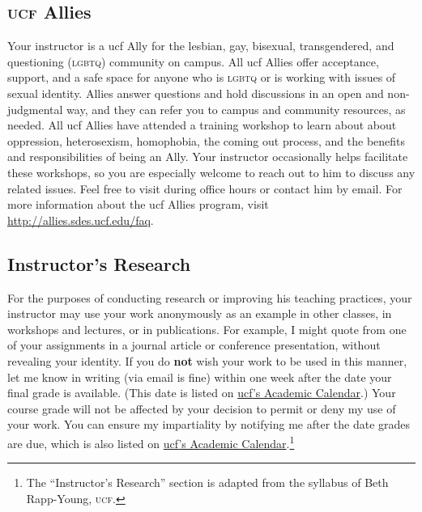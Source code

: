 \documentclass[11pt,oneside]{amsart}	%
\begin{document}
\subsection{\textsc{ucf} Allies} %
\label{sub:allies}
Your instructor is a \ac{ucf} Ally for the lesbian, gay, bisexual, transgendered, and questioning (\textsc{lgbtq}) community on campus. All \ac{ucf} Allies offer acceptance, support, and a safe space for anyone who is \textsc{lgbtq} or is working with issues of sexual identity. Allies answer questions and hold discussions in an open and non-judgmental way, and they can refer you to campus and community resources, as needed. All \ac{ucf} Allies have attended a training workshop to learn about about oppression, heterosexism, homophobia, the coming out process, and the benefits and responsibilities of being an Ally. Your instructor occasionally helps facilitate these workshops, so you are especially welcome to reach out to him to discuss any related issues. Feel free to visit during office hours or contact him by email. For more information about the \ac{ucf} Allies program, visit \href{http://allies.sdes.ucf.edu/faq}{http://allies.sdes.ucf.edu/faq}.

\subsection{Instructor's Research} %
\label{sub:instructor_s_research}
For the purposes of conducting research or improving his teaching practices, your instructor may use your work anonymously as an example in other classes, in workshops and lectures, or in publications. For example, I might quote from one of your assignments in a journal article or conference presentation, without revealing your identity. If you do \textbf{not} wish your work to be used in this manner, let me know in writing (via email is fine) within one week after the date your final grade is available. (This date is listed on \href{http://registrar.sdes.ucf.edu/calendar/academic/}{\ac{ucf}'s Academic Calendar}.) Your course grade will not be affected by your decision to permit or deny my use of your work. You can ensure my impartiality by notifying me after the date grades are due, which is also listed on \href{http://registrar.sdes.ucf.edu/calendar/academic/}{\ac{ucf}'s Academic Calendar}.\footnote{The ``Instructor's Research'' section is adapted from the syllabus of Beth Rapp-Young, \textsc{ucf}.}

\clearpage%
\end{document}
